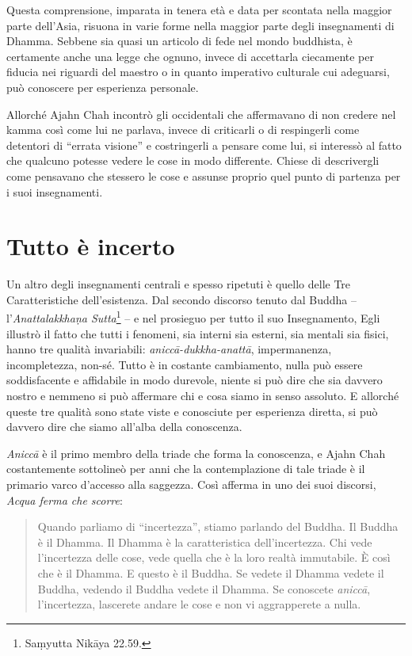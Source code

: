 Questa comprensione, imparata in tenera età e data per scontata nella
maggior parte dell'Asia, risuona in varie forme nella maggior parte
degli insegnamenti di Dhamma. Sebbene sia quasi un articolo di fede nel
mondo buddhista, è certamente anche una legge che ognuno, invece di
accettarla ciecamente per fiducia nei riguardi del maestro o in quanto
imperativo culturale cui adeguarsi, può conoscere per esperienza
personale.

Allorché Ajahn Chah incontrò gli occidentali che affermavano di non
credere nel kamma così come lui ne parlava, invece di criticarli
o di respingerli come detentori di ``errata visione'' e costringerli a
pensare come lui, si interessò al fatto che qualcuno potesse vedere le
cose in modo differente. Chiese di descrivergli come pensavano che
stessero le cose e assunse proprio quel punto di partenza per i suoi
insegnamenti.

\section{Tutto è incerto}

Un altro degli insegnamenti centrali e spesso ripetuti è quello delle
Tre Caratteristiche dell'esistenza. Dal secondo discorso tenuto dal
Buddha -- l'\emph{Anattalakkhaṇa Sutta}\footnote{Saṃyutta Nikāya
  22.59.} -- e nel prosieguo per tutto il suo Insegnamento, Egli
illustrò il fatto che tutti i fenomeni, sia interni sia esterni, sia
mentali sia fisici, hanno tre qualità invariabili:
\emph{aniccā-dukkha-anattā}, impermanenza, incompletezza, non-sé. Tutto
è in costante cambiamento, nulla può essere soddisfacente e affidabile
in modo durevole, niente si può dire che sia davvero nostro e nemmeno si
può affermare chi e cosa siamo in senso assoluto. E allorché queste tre
qualità sono state viste e conosciute per esperienza diretta, si può
davvero dire che siamo all'alba della conoscenza.

\emph{Aniccā} è il primo membro della triade che forma la conoscenza, e
Ajahn Chah costantemente sottolineò per anni che la contemplazione di
tale triade è il primario varco d'accesso alla saggezza. Così afferma in
uno dei suoi discorsi, \emph{Acqua ferma che scorre}:

\begin{quote}
Quando parliamo di ``incertezza'', stiamo parlando del Buddha. Il Buddha
è il Dhamma. Il Dhamma è la caratteristica dell'incertezza. Chi vede
l'incertezza delle cose, vede quella che è la loro realtà immutabile. È
così che è il Dhamma. E questo è il Buddha. Se vedete il Dhamma vedete
il Buddha, vedendo il Buddha vedete il Dhamma. Se conoscete
\emph{aniccā}, l'incertezza, lascerete andare le cose e non vi
aggrapperete a nulla.
\end{quote}

